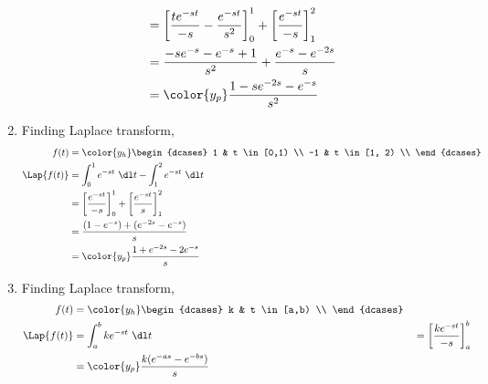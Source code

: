 \begin{enumerate}
\begin{align}
                               & = \left[ \frac{te^{-st}}{-s}
                        - \frac{e^{-st}}{s^2}  \right]_0^1
                  + \left[ \frac{e^{-st}}{-s} \right]_1^2                      \\
                               & = \frac{-se^{-s} - e^{-s} + 1}{s^2}
                  + \frac{e^{-s} - e^{-2s}}{s}                                 \\
                               & = \color{y_p}\frac{1 - se^{-2s}- e^{-s}}{s^2}
            \end{align}
      \item Finding Laplace transform,
            \begin{align}
                  f(t)         & = \color{y_h}
                  \begin{dcases}
                        1  & t \in [0,1)  \\
                        -1 & t \in [1, 2) \\
                  \end{dcases}                                            \\
                  \Lap\{f(t)\} & =  \int_{0}^{1} e^{-st}\ \dl t
                  -  \int_{1}^{2} e^{-st}\ \dl t                               \\
                               & = \left[ \frac{e^{-st}}{-s} \right]_0^1
                  + \left[ \frac{e^{-st}}{s} \right]_1^2                       \\
                               & = \frac{(1 - e^{-s}) + (e^{-2s} - e^{-s})}{s} \\
                               & = \color{y_p}\frac{1 + e^{-2s} - 2e^{-s}}{s}
            \end{align}
      \item Finding Laplace transform,
            \begin{align}
                  f(t)         & = \color{y_h}
                  \begin{dcases}
                        k & t \in [a,b) \\
                  \end{dcases}                                              \\
                  \Lap\{f(t)\} & =  \int_{a}^{b} ke^{-st}\ \dl t             &
                               & = \left[ \frac{ke^{-st}}{-s} \right]_a^b      \\
                               & = \color{y_p}\frac{k(e^{-as} - e^{-bs})}{s}
            \end{align}

\end{enumerate}
